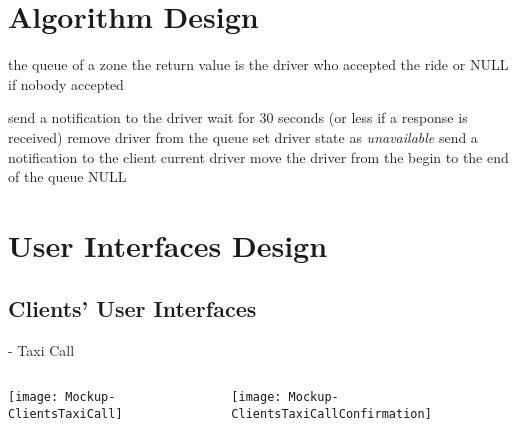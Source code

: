 \documentclass[9pt]{beamer}
\makeatletter
\newcommand*{\currentname}{\@currentlabelname}
\makeatother
\begin{document}
\section{Algorithm Design}
\begin{frame}{\currentname}

\begin{algorithm}[H]
\begin{algorithmic}
    
    \REQUIRE the queue of a zone
    \ENSURE the return value is the driver who accepted the ride or NULL if nobody accepted
    
        \STATE send a notification to the driver
        \STATE wait for 30 seconds (or less if a response is received)
            \STATE remove driver from the queue
            \STATE set driver state as \emph{unavailable}
            \STATE send a notification to the client
            \RETURN current driver
            \STATE move the driver from the begin to the end of the queue
        \ENDIF
    \ENDFOR
    \RETURN NULL
\end{algorithmic}
\end{algorithm}

\end{frame}

\section{User Interfaces Design}
\subsection{Clients' User Interfaces}
\begin{frame}{\currentname{} - Taxi Call}
\begin{columns}[c]
  \begin{column}{.5\textwidth}
		\texttt{[image: Mockup-ClientsTaxiCall]}
		\centering
  \end{column}
  \begin{column}{.5\textwidth}
    \texttt{[image: Mockup-ClientsTaxiCallConfirmation]}
		\centering
  \end{column}
\end{columns}
\end{frame}
\end{document}
